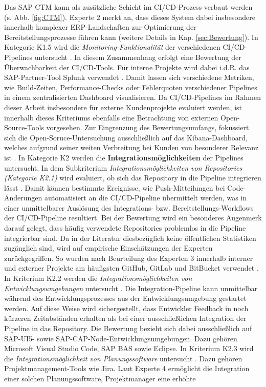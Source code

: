 Das SAP CTM kann als zusätzliche Schicht im CI/CD-Prozess verbaut werden (s. Abb. \ref{fig:CTM}). Experte 2 merkt an, dass dieses System dabei insbesondere innerhalb komplexer ERP-Landschaften zur Optimierung der Bereitstellungsprozesse führen kann (weitere Details in Kap. \ref{sec:Bewertung})\cite[Z. 65 ff.]{ProductManagerSAPHyperspaceCICD.}. In Kategorie K1.5 wird die \textit{Monitoring-Funktionalität} der verschiedenen CI/CD-Pipelines untersucht \cite[Z. 37 ff.]{ProductManagerSAPHyperspaceCICD.}. In diesem Zusammenhang erfolgt eine Bewertung der Überwachbarkeit der CI/CD-Tools. Für interne Projekte wird dabei i.d.R. das SAP-Partner-Tool Splunk verwendet \cite[Z. 74 ff.]{ProductManagerSAPHyperspaceCICD.}. Damit lassen sich verschiedene Metriken, wie Build-Zeiten, Performance-Checks oder Fehlerquoten verschiedener Pipelines in einem zentralisierten Dashboard visualisieren. Da CI/CD-Pipelines im Rahmen dieser Arbeit insbesondere für externe Kundenprojekte evaluiert werden, ist innerhalb dieses Kriteriums ebenfalls eine Betrachtung von externen Open-Source-Tools vorgesehen. Zur Eingrenzung des Bewertungsumfangs, fokussiert sich die Open-Soruce-Untersuchung ausschließlich auf das Kibana-Dashboard, welches aufgrund seiner weiten Verbreitung bei Kunden von besonderer Relevanz ist \cite[Z. 74 ff.]{ProductManagerSAPHyperspaceCICD.}. In Kategorie K2 werden die \textbf{Integrationsmöglichkeiten} der Pipelines untersucht. In dem Subkriterium \textit{Integrationsmöglichkeiten von Repositories (Kategorie K2.1)} wird evaluiert, ob sich das Repository in die Pipeline integrieren lässt \cite[Z. 89 ff.]{ProductOwnerSAPBTPProd&Infra.}. Damit können bestimmte Ereignisse, wie Push-Mitteilungen bei Code-Änderungen automatisiert an die CI/CD-Pipeline übermittelt werden, was in einer unmittelbarer Auslösung des Integrations- bzw. Bereitstellungs-Workflows der CI/CD-Pipeline resultiert. Bei der Bewertung wird ein besonderes Augenmerk darauf gelegt, dass häufig verwendete Repositories problemlos in die Pipeline integrierbar sind. Da in der Literatur diesbezüglich keine öffentlichen Statistiken zugänglich sind, wird auf empirische Einschätzungen der Experten zurückgegriffen. So wurden nach Beurteilung des Experten 3 innerhalb interner und externer Projekte am häufigsten GitHub, GitLab und BitBucket verwendet \cite[Z. 95 ff.]{TestDeveloperSAPHyperspaceAdoption&Onboarding.}. In Kriterium K2.2 werden die \textit{Integrationsmöglichkeiten von Entwicklungsumgebungen} untersucht \cite[Z. 93 ff.]{ProductOwnerSAPBTPProd&Infra.}. Die Integration-Pipeline kann unmittelbar während des Entwicklungsprozesses aus der Entwicklungsumgebung gestartet werden. Auf diese Weise wird sichergestellt, dass Entwickler Feedback in noch kürzeren Zeitabständen erhalten als bei einer ausschließlichen Integration der Pipeline in das Repository. Die Bewertung bezieht sich dabei ausschließlich auf SAP-UI5- sowie SAP-CAP-Node-Entwicklungsumgebungen. Dazu gehören Microsoft Visual Studio Code, \ac{SAP BAS} sowie Eclipse. In Kriterium K2.3 wird die \textit{Integrationsmöglichkeit von Planungssoftware} untersucht \cite[Z. 96 ff.]{TestDeveloperSAPHyperspaceAdoption&Onboarding.}. Dazu gehören Projektmanagement-Tools wie Jira. Laut Experte 4 ermöglicht die Integration einer solchen Planungssoftware, Projektmanager eine erhöhte 